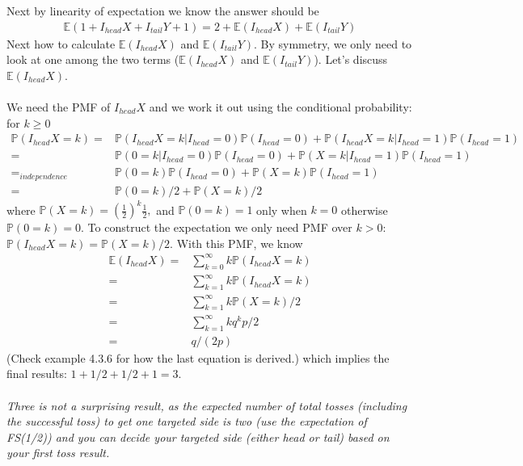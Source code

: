 \begin{exercise} [BH.4.18]
\begin{solution}
	Next by linearity of expectation we know the answer should be 
	\begin{align*}
		\mathbb{E}\left(1 + I_{head} X + I_{tail} Y+1\right)=2+\mathbb{E}\left( I_{head} X\right)  +\mathbb{E}\left( I_{tail}Y\right)  
	\end{align*}
	Next how to calculate $\mathbb{E}\left( I_{head} X\right)$ and $\mathbb{E}\left( I_{tail}Y\right)$. By symmetry, we only need to look at one among the two terms ($\mathbb{E}\left( I_{head} X\right)$ and $\mathbb{E}\left( I_{tail}Y\right)$). Let's discuss  $\mathbb{E}\left( I_{head} X\right)$. \\~\\
	We need the PMF of  $I_{head} X$ and we work it out using the conditional probability: for $k\geq 0$
	\begin{align*}
		\mathbb{P}\left(I_{head} X =k\right) =& 	\mathbb{P}\left(I_{head} X =k |I_{head}=0 \right)\mathbb{P}\left(I_{head}=0 \right) +	\mathbb{P}\left(I_{head} X=k|I_{head}=1 \right)\mathbb{P}\left(I_{head}=1 \right)\\=& 	\mathbb{P}\left(0 =k |I_{head}=0 \right)\mathbb{P}\left(I_{head}=0 \right) +	\mathbb{P}\left(  X=k|I_{head}=1 \right)\mathbb{P}\left(I_{head}=1 \right)\\=_{\textit{independence}}& 	\mathbb{P}\left(0 =k  \right)\mathbb{P}\left(I_{head}=0 \right) +	\mathbb{P}\left(  X=k \right)\mathbb{P}\left(I_{head}=1 \right)\\= & 	\mathbb{P}\left(0 =k  \right)/2+	\mathbb{P}\left(  X=k \right)/2
	\end{align*}
	where $\mathbb{P}\left(  X=k \right) = (\frac{1}{2})^k\frac{1}{2}, $ and $	\mathbb{P}\left(0 =k  \right) =1$ only when $k=0$ otherwise $	\mathbb{P}\left(0 =k  \right) =0$. To construct the expectation we only need PMF over $k>0$: $\mathbb{P}\left(I_{head} X =k\right)= \mathbb{P}\left(  X=k \right)/2$. With this PMF, we know 
	\begin{align*}
		\mathbb{E}\left( I_{head} X\right) = & \sum_{k=0}^\infty k\mathbb{P}\left(I_{head} X =k\right)\\= & \sum_{k=1}^\infty k\mathbb{P}\left(I_{head} X =k\right)\\= & \sum_{k=1}^\infty k\mathbb{P}\left(X =k\right)/2\\= & \sum_{k=1}^\infty k q^k p/2 \\
		=& q/(2p)
	\end{align*} 
	(Check example 4.3.6 for how the last equation is derived.) which implies the final results: $1+1/2+1/2+1=3$.\\~\\
	\textit{Three is not a surprising result, as the expected number of total tosses (including the successful toss) to get one targeted side is two (use the expectation of FS(1/2)) and you can decide your targeted side (either head or tail)  based on your first toss result.}
\end{solution}
\end{exercise}

